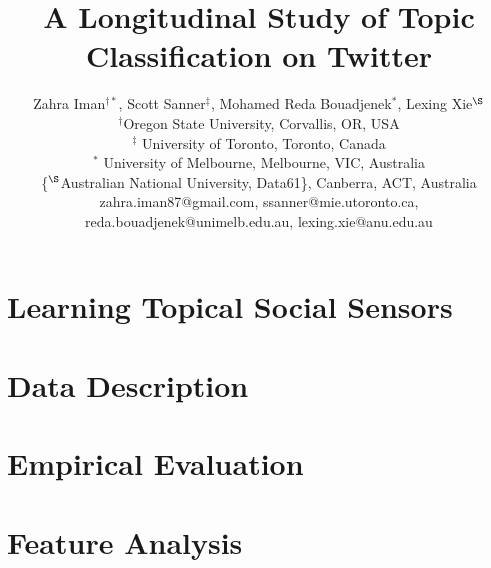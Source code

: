 \documentclass[letterpaper]{article}
\begin{document}
%
\title{A Longitudinal Study of Topic Classification on Twitter}
\author {Zahra Iman$^{\dag*}$, Scott Sanner$^{\ddagger}$, Mohamed Reda Bouadjenek$^{*}$, Lexing Xie$^{\S}$\\
	$^{\dag}$Oregon State University, Corvallis, OR, USA\\
	$^{\ddagger}$ University of Toronto, Toronto, Canada\\
	$^{*}$ University of Melbourne, Melbourne, VIC, Australia\\
	\{$^{\S}$Australian National University, Data61\}, Canberra, ACT, Australia\\
	{\footnotesize zahra.iman87@gmail.com, ssanner@mie.utoronto.ca, reda.bouadjenek@unimelb.edu.au, lexing.xie@anu.edu.au}
}
\maketitle
\begin{abstract}

\end{abstract}

%

\section{Learning Topical Social Sensors}
\label{sec:lss}


\section{Data Description}
\label{sec:datasetStatistics}


\section{Empirical Evaluation}
\label{sec:methodology}


\section{Feature Analysis}
\label{label:featureanalysis}

\end{document}
